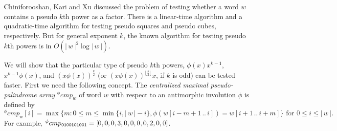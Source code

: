 \documentclass{article}
\def\subw#1#2#3{{#1[#2\,..\,#3]}}
\def\abs#1{{|\,#1\,|}}
\begin{document}
Chiniforooshan, Kari and Xu \cite{pseudopower} discussed the problem
of testing whether a word $w$ contains a pseudo $k$th power as a
factor. There is a linear-time algorithm and a quadratic-time
algorithm for testing pseudo squares and pseudo cubes, respectively.
But for general exponent $k$, the known algorithm for testing pseudo
$k$th powers is in $O(\abs{w}^2\log\abs{w})$.


We will show that the particular type of pseudo $k$th powers,
$\phi(x)x^{k-1}$, $x^{k-1}\phi(x)$, and $(x\phi(x))^{\frac{k}{2}}$
(or $(x\phi(x))^{\lfloor\frac{k}{2}\rfloor}x$, if $k$ is odd) can be
tested faster. First we need the following concept. The
\emph{centralized maximal pseudo-palindrome array} ${}^\phi cmp_w$
of word $w$ with respect to an antimorphic involution $\phi$ is
defined by
  \[{}^\phi cmp_w[i] = \max\{m:0\leq m\leq\min\{i,\abs{w}-i\},\phi(\subw{w}{i-m+1}{i})=\subw{w}{i+1}{i+m}\}\textrm{ for }0\leq i\leq\abs{w}.\]
For example, ${}^\phi cmp_{\tt0100101001}=[0,0,0,3,0,0,0,0,2,0,0]$.
\end{document}
